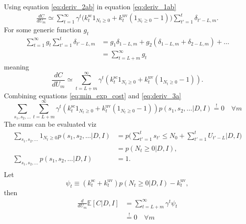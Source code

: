 Using equation \eqref{eq:deriv_2ab} in equation \eqref{eq:deriv_1ab} 
\begin{equation}
	\begin{split}
		\frac{dC}{dU_m} \simeq \sum_{t=1}^{\infty}\gamma^{t}\bigg(k^\text{sc}_{t}1_{N_{t}\geq 0}+k_{t}^\text{uv}(1_{N_{t}\geq 0}-1)\bigg)\sum_{t'=1}^t\delta_{t'-L,m}.
	\end{split}
\end{equation}
For some generic function $g_t$
\begin{equation}
	\begin{split}
		\sum_{t=1}^{\infty}g_t\sum_{t'=1}^t\delta_{t'-L,m} & = g_1\delta_{1-L,m}+g_2(\delta_{1-L,m}+\delta_{2-L,m})+\dots\\
		&=\sum_{t=L+m}^\infty g_t
	\end{split}
\end{equation}
meaning
\begin{equation}
	\frac{dC}{dU_m} \simeq \sum_{t=L+m}^{\infty}\gamma^{t}(k^\text{sc}_{t}1_{N_{t}\geq 0}+k_{t}^\text{uv}(1_{N_{t}\geq 0}-1)).
	\label{eq:deriv_3a}
\end{equation}
Combining equations \eqref{eq:min_exp_cost} and \eqref{eq:deriv_3a}
\begin{equation}
	\sum_{s_1,s_2,\dots}\sum_{t=L+m}^{\infty}\gamma^{t}(k^\text{sc}_{t}1_{N_{t}\geq 0}+k_{t}^\text{uv}(1_{N_{t}\geq 0}-1))p(s_1,s_{2},\dots|D,I)\overset{!}{=} 0\quad \forall m
\end{equation}
The sums can be evaluated viz
\begin{equation}
	\begin{split}
		\sum_{s_1,s_2,\dots}1_{N_{t}\geq 0}p(s_1,s_{2},\dots|D,I) &= p\bigg(\sum_{t'=1}^{t}s_{t'}\leq N_0+\sum_{t'=1}^{t}U_{t'-L}|D,I\bigg)\\
		&= p(N_t\geq 0|D,I),\\
		\sum_{s_1,s_2,\dots}p(s_1,s_{2},\dots|D,I)&=1.\\
	\end{split}
\end{equation}
Let
\begin{equation}
	\psi_t\equiv (k^\text{sc}_{t}+k_{t}^\text{uv})p(N_t\geq 0|D,I)-k_{t}^\text{uv},
\end{equation} 
then
\begin{equation}
	\begin{split}
		\frac{d}{dU_m}\mathbb{E}[C|D,I]& = \sum_{t=L+m}^{\infty}\gamma^{t}\psi_t\\
		&\overset{!}{=} 0\quad \forall m
	\end{split}
\end{equation}
